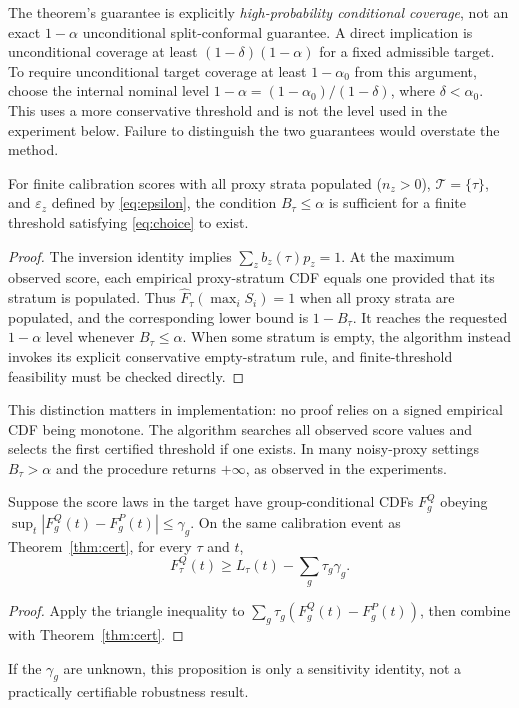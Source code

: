 \documentclass[twoside,11pt]{article}
\begin{document}
The theorem's guarantee is explicitly \emph{high-probability conditional coverage}, not an exact $1-\alpha$ unconditional split-conformal guarantee. A direct implication is unconditional coverage at least $(1-\delta)(1-\alpha)$ for a fixed admissible target. To require unconditional target coverage at least $1-\alpha_0$ from this argument, choose the internal nominal level $1-\alpha=(1-\alpha_0)/(1-\delta)$, where $\delta<\alpha_0$. This uses a more conservative threshold and is not the level used in the experiment below. Failure to distinguish the two guarantees would overstate the method.

\begin{corollary}\label{cor:finite}
For finite calibration scores with all proxy strata populated ($n_z>0$), $\mathcal T=\{\tau\}$, and $\varepsilon_z$ defined by \eqref{eq:epsilon}, the condition $B_\tau\le\alpha$ is sufficient for a finite threshold satisfying \eqref{eq:choice} to exist.
\end{corollary}
\begin{proof}
The inversion identity implies $\sum_zb_z(\tau)p_z=1$. At the maximum observed score, each empirical proxy-stratum CDF equals one provided that its stratum is populated. Thus $\widehat F_\tau(\max_i S_i)=1$ when all proxy strata are populated, and the corresponding lower bound is $1-B_\tau$. It reaches the requested $1-\alpha$ level whenever $B_\tau\le\alpha$. When some stratum is empty, the algorithm instead invokes its explicit conservative empty-stratum rule, and finite-threshold feasibility must be checked directly.
\end{proof}

\noindent This distinction matters in implementation: no proof relies on a signed empirical CDF being monotone. The algorithm searches all observed score values and selects the first certified threshold if one exists. In many noisy-proxy settings $B_\tau>\alpha$ and the procedure returns $+\infty$, as observed in the experiments.

\begin{proposition}\label{prop:drift}
Suppose the score laws in the target have group-conditional CDFs $F_g^Q$ obeying $\sup_t|F_g^Q(t)-F_g^P(t)|\le\gamma_g$. On the same calibration event as Theorem~\ref{thm:cert}, for every $\tau$ and $t$,
\[F_\tau^Q(t)\ge L_\tau(t)-\sum_g\tau_g\gamma_g.\]
\end{proposition}
\begin{proof}
Apply the triangle inequality to $\sum_g\tau_g(F_g^Q(t)-F_g^P(t))$, then combine with Theorem~\ref{thm:cert}.
\end{proof}
If the $\gamma_g$ are unknown, this proposition is only a sensitivity identity, not a practically certifiable robustness result.
\end{document}
